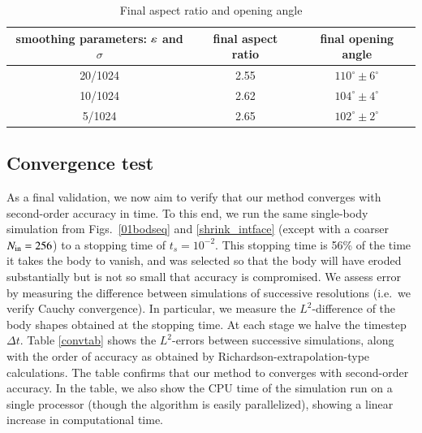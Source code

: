 \documentclass[preprint, 10pt]{elsarticle}
\begin{document}
\begin{table}%
\begin{center}
\caption{Final aspect ratio and opening angle
} 
\vspace{0.3 pc}
\label{table:arangle}
\begin{tabular}{c c c}
\hline
\hspace{0.5pc} smoothing parameters: $\varepsilon$ and $\sigma$
\hspace{0.5pc} & final aspect ratio 
\hspace{0.5pc} & final opening angle \\
\hline
20/1024		& 2.55	& $110^\circ \pm 6^\circ$	\\
10/1024		& 2.62	& $104^\circ \pm 4^\circ$	\\
5/1024		& 2.65	& $102^\circ \pm 2^\circ$	\\
\hline
\end{tabular}
\end{center}
\end{table}


\subsection{Convergence test}

As a final validation, we now aim to verify that our method converges with second-order accuracy in time. To this end, we run the same single-body simulation from Figs.~\ref{01bodseq} and \ref{shrink_intface} (except with a coarser $N_{\mathrm{in}}=256$) to a stopping time of $t_s = 10^{-2}$. This stopping time is 56\% of the time it takes the body to vanish, and was selected so that the body will have eroded substantially but is not so small that accuracy is compromised. We assess error by measuring the difference between simulations of successive resolutions (i.e.~we verify Cauchy convergence). In particular, we measure the $L^2$-difference of the body shapes obtained at the stopping time. At each stage we halve the timestep $\Delta t$. Table \ref{convtab} shows the $L^2$-errors between successive simulations, along with the order of accuracy as obtained by Richardson-extrapolation-type calculations. The table confirms that our method to converges with second-order accuracy. In the table, we also show the CPU time of the simulation run on a single processor (though the algorithm is easily parallelized), showing a linear increase in computational time.
\end{document}
